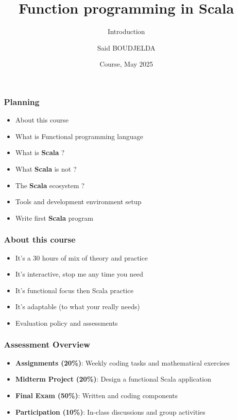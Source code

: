 \documentclass{beamer}
\title[Scala] %
{Function programming in Scala}
\subtitle{Introduction}
\author[Said BOUDJELDA] %
{Said BOUDJELDA}
\institute[efrei] %
{
  Senior Software Engineer @SCIAM\\
  Email : mohamed-said.boudjelda@intervenants.efrei.net \\ 
  Follow me on GitHub @bmscomp
}
\date[efrei 2025] %
{Course, May 2025}
\begin{document}
\frame{\titlepage}

\begin{frame}
\frametitle{Planning}


\begin{itemize}
    \item About this course 
    \item What is Functional programming language
    \item What is \textbf{Scala} ? 
    \item What \textbf{Scala} is not ? 
    \item The \textbf{Scala} ecosystem ? 
    \item Tools and development environment setup
    \item Write first \textbf{Scala} program
\end{itemize}
\end{frame}


\begin{frame}
\frametitle{About this course}

\begin{itemize}
    \item It's a 30 hours of mix of theory and practice
    \item It's interactive, stop me any time you need
    \item It's functional focus then Scala practice
    \item It's adaptable (to what your really needs)
    \item Evaluation policy and assessments
\end{itemize}
\end{frame}


\begin{frame}
\frametitle{Assessment Overview}

\begin{itemize}
    \item \textbf{Assignments (20\%)}: Weekly coding tasks and mathematical exercises
    \item \textbf{Midterm Project (20\%)}: Design a functional Scala application
    \item \textbf{Final Exam (50\%)}: Written and coding components
    \item \textbf{Participation (10\%)}: In-class discussions and group activities
\end{itemize}
\end{frame}
\end{document}
